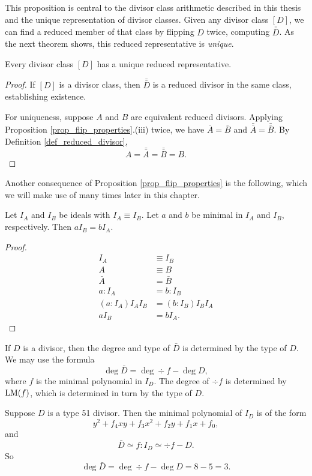This proposition is central to the divisor class arithmetic described in this thesis
and the unique representation of divisor classes.
Given any divisor class $[D]$, we can find a reduced member of that class by
flipping $D$ twice, computing $\bar{\bar D}$. As the next theorem shows,
this reduced representative is \emph{unique}.

\begin{theorem}
  Every divisor class $[D]$ has a unique reduced representative.
\end{theorem}
\begin{proof}
  If $[D]$ is a divisor class, then $\bar{\bar D}$ is a reduced divisor in the same class,
  establishing existence.
  
  For uniqueness, suppose $A$ and $B$ are equivalent reduced divisors.
  Applying Proposition \ref{prop_flip_properties}.(iii) twice,
  we have $\bar A = \bar B$ and $\bar{\bar A} = \bar{\bar B}$.
  By Definition \ref{def_reduced_divisor},
    \[ A = \bar{\bar A} = \bar{\bar B} = B. \]
\end{proof}

Another consequence of Proposition \ref{prop_flip_properties} is the following,
which we will make use of many times later in this chapter.
\begin{proposition}
  \label{prop_aI_B_is_bI_A}
  Let $I_A$ and $I_B$ be ideals with $I_A \equiv I_B$.
  Let $a$ and $b$ be minimal in $I_A$ and $I_B$, respectively.
  Then $aI_B = bI_A$.
\end{proposition}
\begin{proof}
  \begin{align*}
    I_A &\equiv I_B \\
    A &\equiv B \\
    \bar A &= \bar B \\
    a : I_A &= b : I_B \\
    (a : I_A)I_AI_B &= (b : I_B)I_BI_A \\
    aI_B &= bI_A.
  \end{align*}
\end{proof}

If $D$ is a divisor, then the degree and type of $\bar D$ is determined by the type of $D$.
We may use the formula
\begin{equation}
  \label{eq_flip_degree}
  \deg \bar D = \deg \div f - \deg D,
\end{equation}
where $f$ is the minimal polynomial in $I_D$. The degree of $\div f$ is determined by $\operatorname{LM}(f)$,
which is determined in turn by the type of $D$.
\begin{example}
  Suppose $D$ is a type 51 divisor.
  Then the minimal polynomial of $I_D$ is of the form
  \[ y^2 + f_4xy + f_3x^2 + f_2y + f_1x + f_0, \]
  and
  \[ \bar D \simeq f : I_D \simeq \div f - D. \]
  So
  \[ \deg \bar D = \deg \div f - \deg D = 8 - 5 = 3. \]
\end{example}

